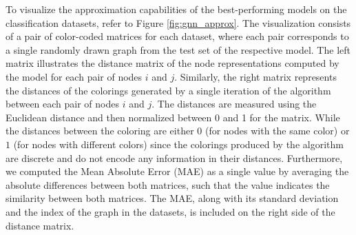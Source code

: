 To visualize the approximation capabilities of the best-performing \gnn models on the classification datasets, refer to Figure \ref{fig:gnn_approx}. The visualization consists of a pair of color-coded matrices for each dataset, where each pair corresponds to a single randomly drawn graph from the test set of the respective \gnn model. The left matrix illustrates the distance matrix of the node representations computed by the \gnn model for each pair of nodes $i$ and $j$. Similarly, the right matrix represents the distances of the colorings generated by a single iteration of the \wl algorithm between each pair of nodes $i$ and $j$. The distances are measured using the Euclidean distance and then normalized between 0 and 1 for the \gnn matrix. While the distances between the \wl coloring are either $0$ (for nodes with the same color) or $1$ (for nodes with different colors) since the colorings produced by the \wl algorithm are discrete and do not encode any information in their distances. Furthermore, we computed the Mean Absolute Error (MAE) as a single value by averaging the absolute differences between both matrices, such that the value indicates the similarity between both matrices. The MAE, along with its standard deviation and the index of the graph in the datasets, is included on the right side of the \wl distance matrix.

